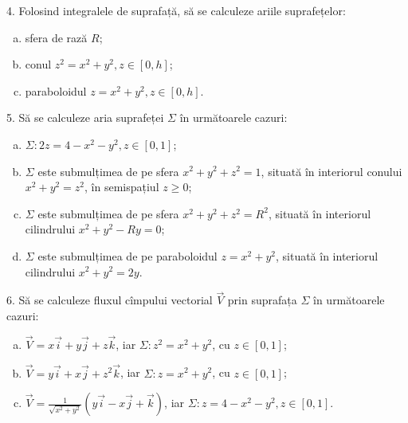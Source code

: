 \documentclass[11pt,a4paper]{article}
\theoremstyle{dotless}
\theoremstyle{dotlessdr}
\begin{document}
\vspace{1cm}

4. Folosind integralele de suprafață, să se calculeze ariile suprafețelor:
\begin{enumerate}[(a)]
\item sfera de rază $R$;
\item conul $z^2 = x^2 + y^2, z \in [0, h]$;
\item paraboloidul $z = x^2 + y^2, z \in [0, h]$.
\end{enumerate}

\vspace{1cm}

5. Să se calculeze aria suprafeței $\Sigma$ în următoarele cazuri:
\begin{enumerate}[(a)]
\item $\Sigma : 2z = 4 - x^2 - y^2, z \in [0, 1]$;
\item $\Sigma$ este submulțimea de pe sfera $x^2 + y^2 + z^2 = 1$, situată în interiorul
  conului $x^2 + y^2 = z^2$, în semispațiul $z \geq 0$;
\item $\Sigma$ este submulțimea de pe sfera $x^2 + y^2 + z^2 = R^2$, situată în interiorul
  cilindrului $x^2 + y^2 - Ry = 0$;
\item $\Sigma$ este submulțimea de pe paraboloidul $z = x^2 + y^2$, situată în interiorul
  cilindrului $x^2 + y^2 = 2y$.
\end{enumerate}

\vspace{1cm}

6. Să se calculeze fluxul cîmpului vectorial $\vec{V}$ prin suprafața $\Sigma$
în următoarele cazuri:
\begin{enumerate}[(a)]
\item $\vec{V} = x\vec{i} + y\vec{j} + z \vec{k}$, iar $\Sigma: z^2 = x^2 + y^2$,
  cu $z \in [0, 1]$;
\item $\vec{V} = y\vec{i} + x \vec{j} + z^2 \vec{k}$, iar $\Sigma: z = x^2 + y^2$, cu
  $z \in [0, 1]$;
\item $\vec{V} = \frac{1}{\sqrt{x^2 + y^2}} (y\vec{i} - x \vec{j} + \vec{k})$, iar
  $\Sigma: z = 4 - x^2 - y^2, z \in [0, 1]$.
\end{enumerate}
\end{document}
